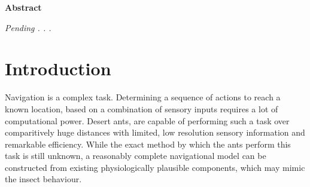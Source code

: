 \documentclass[a4paper,11pt,twoside,openright]{article}
\let\oldsection\section
\def\section{\cleardoublepage\oldsection}
\begin{document}
\newpage
\thispagestyle{empty}
\mbox{}
\newpage

\centering
{\LARGE\textbf{Abstract}}
\begin{flushleft}
  {\small \textit{Pending . . .}}
\end{flushleft}

\newpage

\tableofcontents
\newpage

\listoffigures
\newpage

\listoftables
\newpage
\thispagestyle{empty}
\mbox{}
\newpage


\raggedright

\section{ Introduction }
Navigation is a complex task. Determining a sequence of actions to reach a
known location, based on a combination of sensory inputs requires a lot of
computational power. Desert ants, are capable of performing such a task
over comparitively huge distances with limited, low resolution sensory
information and remarkable efficiency. While the exact method by which
the ants perform this task is still unknown, a reasonably complete navigational
model can be constructed from existing physiologically plausible components,
which may mimic the insect behaviour.
\newline
\par
\end{document}
